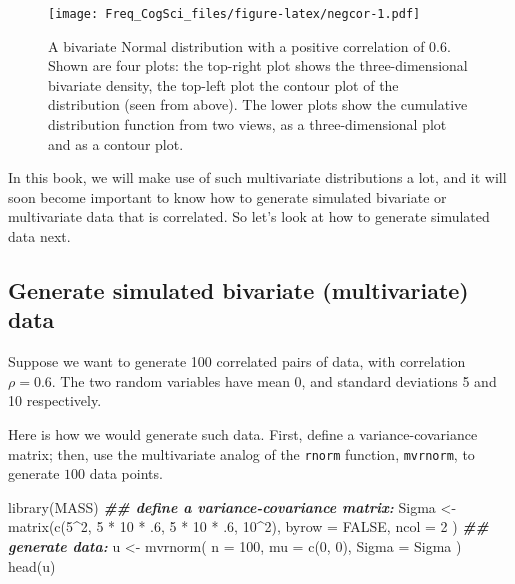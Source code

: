 \documentclass[
  12pt,
]{krantz}
\newenvironment{Shaded}{\begin{snugshade}}{\end{snugshade}}
\newcommand{\AttributeTok}[1]{\textcolor[rgb]{0.77,0.63,0.00}{#1}}
\newcommand{\ConstantTok}[1]{\textcolor[rgb]{0.00,0.00,0.00}{#1}}
\newcommand{\DecValTok}[1]{\textcolor[rgb]{0.00,0.00,0.81}{#1}}
\newcommand{\DocumentationTok}[1]{\textcolor[rgb]{0.56,0.35,0.01}{\textbf{\textit{#1}}}}
\newcommand{\FunctionTok}[1]{\textcolor[rgb]{0.00,0.00,0.00}{#1}}
\newcommand{\NormalTok}[1]{#1}
\newcommand{\OtherTok}[1]{\textcolor[rgb]{0.56,0.35,0.01}{#1}}
\newcommand{\SpecialCharTok}[1]{\textcolor[rgb]{0.00,0.00,0.00}{#1}}
\theoremstyle{definition}
\theoremstyle{definition}
\theoremstyle{definition}
\theoremstyle{definition}
\theoremstyle{remark}
\begin{document}
\begin{figure}
\centering
\texttt{[image: Freq\_CogSci\_files/figure-latex/negcor-1.pdf]}
\caption{\label{fig:negcor}A bivariate Normal distribution with a positive correlation of 0.6. Shown are four plots: the top-right plot shows the three-dimensional bivariate density, the top-left plot the contour plot of the distribution (seen from above). The lower plots show the cumulative distribution function from two views, as a three-dimensional plot and as a contour plot.}
\end{figure}

In this book, we will make use of such multivariate distributions a lot, and it will soon become important to know how to generate simulated bivariate or multivariate data that is correlated. So let's look at how to generate simulated data next.

\hypertarget{generate-simulated-bivariate-multivariate-data}{%
\subsection{Generate simulated bivariate (multivariate) data}\label{generate-simulated-bivariate-multivariate-data}}

Suppose we want to generate 100 correlated pairs of data, with correlation \(\rho=0.6\). The two random variables have mean 0, and standard deviations 5 and 10 respectively.

Here is how we would generate such data. First, define a variance-covariance matrix; then, use the multivariate analog of the \texttt{rnorm} function, \texttt{mvrnorm}, to generate \(100\) data points.

\begin{Shaded}
\begin{Highlighting}[]
\FunctionTok{library}\NormalTok{(MASS)}
\DocumentationTok{\#\# define a variance{-}covariance matrix:}
\NormalTok{Sigma }\OtherTok{\textless{}{-}} \FunctionTok{matrix}\NormalTok{(}\FunctionTok{c}\NormalTok{(}\DecValTok{5}\SpecialCharTok{\^{}}\DecValTok{2}\NormalTok{, }\DecValTok{5} \SpecialCharTok{*} \DecValTok{10} \SpecialCharTok{*}\NormalTok{ .}\DecValTok{6}\NormalTok{, }\DecValTok{5} \SpecialCharTok{*} \DecValTok{10} \SpecialCharTok{*}\NormalTok{ .}\DecValTok{6}\NormalTok{, }\DecValTok{10}\SpecialCharTok{\^{}}\DecValTok{2}\NormalTok{),}
  \AttributeTok{byrow =} \ConstantTok{FALSE}\NormalTok{, }\AttributeTok{ncol =} \DecValTok{2}
\NormalTok{)}
\DocumentationTok{\#\# generate data:}
\NormalTok{u }\OtherTok{\textless{}{-}} \FunctionTok{mvrnorm}\NormalTok{(}
  \AttributeTok{n =} \DecValTok{100}\NormalTok{,}
  \AttributeTok{mu =} \FunctionTok{c}\NormalTok{(}\DecValTok{0}\NormalTok{, }\DecValTok{0}\NormalTok{),}
  \AttributeTok{Sigma =}\NormalTok{ Sigma}
\NormalTok{)}
\FunctionTok{head}\NormalTok{(u)}
\end{Highlighting}
\end{Shaded}
\end{document}
